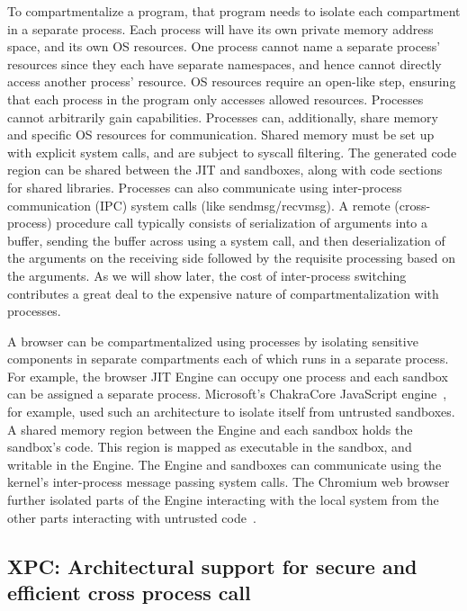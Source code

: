 To compartmentalize a program, that program needs to isolate each compartment in
a separate process.
Each process will have its own private memory address space, and its own 
OS resources.
One process cannot name a separate process' resources since they each have separate
namespaces, and hence cannot directly access another process' resource.
OS resources require an open-like step, ensuring that each process in the program
only accesses allowed resources.
Processes cannot arbitrarily gain capabilities.
Processes can, additionally, share memory and specific OS resources for 
communication.
Shared memory must be set up with explicit system calls, and are subject to 
syscall filtering.
The generated code region can be shared between the JIT and sandboxes, along
with code sections for shared libraries.
Processes can also communicate using inter-process communication (IPC) system 
calls (like sendmsg/recvmsg).
A remote (cross-process) procedure call typically consists of serialization of
arguments into a buffer, sending the buffer across using a system call,
and then deserialization of the arguments on the receiving side followed by
the requisite processing based on the arguments.
As we will show later, the cost of inter-process switching contributes a great
deal to the expensive nature of compartmentalization with processes.

A browser can be compartmentalized using processes by isolating sensitive
components in separate compartments each of which runs in a separate process.
For example, the browser JIT Engine can occupy one process and each sandbox
can be assigned a separate process.
Microsoft's ChakraCore JavaScript engine~\cite{ChakraCore}, for example, 
used such an architecture to isolate itself from untrusted sandboxes.
A shared memory region between the Engine and each sandbox holds the sandbox's
code.
This region is mapped as executable in the sandbox, and writable in the Engine.
The Engine and sandboxes can communicate using the kernel's inter-process 
message passing system calls.
The Chromium web browser further isolated parts of the Engine interacting with
the local system from the other parts interacting with untrusted 
code~\cite{barth2008security}.

\subsection{XPC: Architectural support for secure and efficient cross process call}

